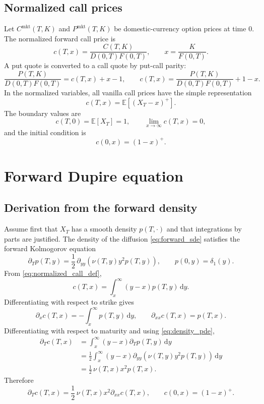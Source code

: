\documentclass[11pt]{article}
\newcommand{\E}{\mathbb{E}}
\newcommand{\1}{\mathbf{1}}
\newcommand{\dd}{\,\mathrm{d}}
\newcommand{\vloc}{\nu}
\begin{document}
\subsection{Normalized call prices}

Let $C^{\mathrm{mkt}}(T,K)$ and $P^{\mathrm{mkt}}(T,K)$ be domestic-currency option
prices at time $0$. The normalized forward call price is
\[
  c(T,x)=\frac{C(T,K)}{D(0,T)F(0,T)},\qquad x=\frac{K}{F(0,T)}.
\]
A put quote is converted to a call quote by put-call parity:
\[
  \frac{P(T,K)}{D(0,T)F(0,T)}=c(T,x)+x-1,
  \qquad
  c(T,x)=\frac{P(T,K)}{D(0,T)F(0,T)}+1-x.
\]
In the normalized variables, all vanilla call prices have the simple representation
\begin{equation}
  c(T,x)=\E[(X_T-x)^+].
  \label{eq:normalized_call_def}
\end{equation}
The boundary values are
\[
  c(T,0)=\E[X_T]=1,\qquad \lim_{x\to\infty}c(T,x)=0,
\]
and the initial condition is
\[
  c(0,x)=(1-x)^+.
\]

\section{Forward Dupire equation}

\subsection{Derivation from the forward density}

Assume first that $X_T$ has a smooth density $p(T,\cdot)$ and that integrations by parts
are justified. The density of the diffusion \eqref{eq:forward_sde} satisfies the forward
Kolmogorov equation
\begin{equation}
  \partial_T p(T,y)
  =\frac12\,\partial_{yy}\!\left(\vloc(T,y)y^2p(T,y)\right),
  \qquad p(0,y)=\delta_1(y).
  \label{eq:density_pde}
\end{equation}
From \eqref{eq:normalized_call_def},
\[
  c(T,x)=\int_x^\infty (y-x)p(T,y)\dd y.
\]
Differentiating with respect to strike gives
\[
  \partial_x c(T,x)=-\int_x^\infty p(T,y)\dd y,
  \qquad
  \partial_{xx}c(T,x)=p(T,x).
\]
Differentiating with respect to maturity and using \eqref{eq:density_pde},
\begin{align*}
  \partial_T c(T,x)
  &=\int_x^\infty (y-x)\partial_Tp(T,y)\dd y\\
  &=\frac12\int_x^\infty (y-x)
     \partial_{yy}\!\left(\vloc(T,y)y^2p(T,y)\right)\dd y\\
  &=\frac12\,\vloc(T,x)x^2p(T,x).
\end{align*}
Therefore
\begin{equation}
  \boxed{
  \partial_T c(T,x)=\frac12\,\vloc(T,x)x^2\partial_{xx}c(T,x),
  \qquad c(0,x)=(1-x)^+.
  }
  \label{eq:forward_dupire_normalized}
\end{equation}
\end{document}

